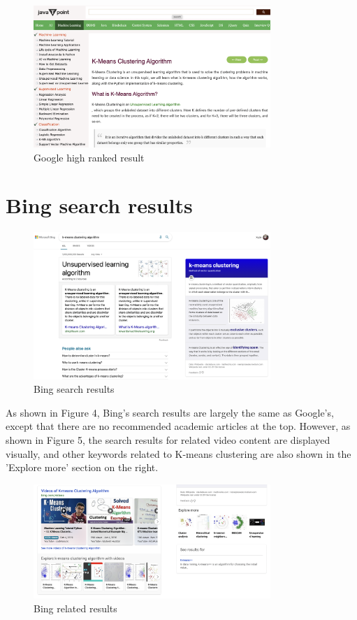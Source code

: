 \documentclass{article}
\begin{document}
    \begin{figure}[ht]
        \centering
        \includegraphics[width=0.8\textwidth]{google1.png}
        \caption{Google high ranked result}
    \end{figure}

    \section{Bing search results}
    \begin{figure}[ht]
        \centering
        \includegraphics[width=0.8\textwidth]{Bing_home.png}
        \caption{Bing search results}
    \end{figure}
    As shown in Figure 4, Bing's search results are largely the same as Google's, except that there are no recommended academic articles at the top. However, as shown in Figure 5, the search results for related video content are displayed visually, and other keywords related to K-means clustering are also shown in the 'Explore more' section on the right.
    \begin{figure}[ht]
        \centering
        \includegraphics[width=0.8\textwidth]{Bing1.png}
        \caption{Bing related results}
    \end{figure}
\end{document}
